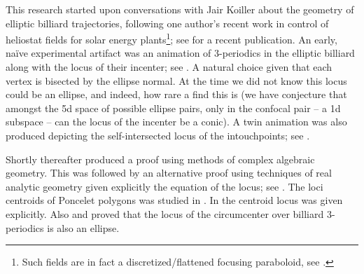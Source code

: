 This research started upon conversations with Jair Koiller about the geometry of elliptic billiard trajectories, following one author's recent work in control of heliostat fields for solar energy plants\footnote{Such fields are in fact a discretized/flattened focusing paraboloid, see \cite{sundrop2016,esolar2017}.}; see \cite{gross2020-solar} for a recent publication. An early, naïve experimental artifact was an animation of 3-periodics in the elliptic billiard along with the locus of their incenter; see  \cite{dsr_vid11incenter}. A natural choice given that each vertex is bisected by the ellipse normal. At the time we did not know this locus could be an ellipse, and indeed, how rare a find this is (we have conjecture that amongst the 5d space of possible ellipse pairs, only in the confocal pair -- a 1d subspace -- can the locus of the incenter be a conic). A twin animation was also produced depicting the self-intersected locus of the intouchpoints; see \cite{dsr_vid11e}.

Shortly thereafter \cite{olga14} produced a proof using methods of complex algebraic geometry.
This was followed by an alternative    proof using techniques of real analytic   geometry given explicitly the equation of the locus; see \cite{garcia2019-incenter}. The loci centroids of Poncelet polygons was studied in \cite{schwartz2016-com}. In  \cite{garcia2019-incenter} the centroid locus was given explicitly.  Also \cite{corentin2021-circum} and \cite{garcia2018} proved that the locus of the circumcenter over billiard 3-periodics is also an ellipse.

